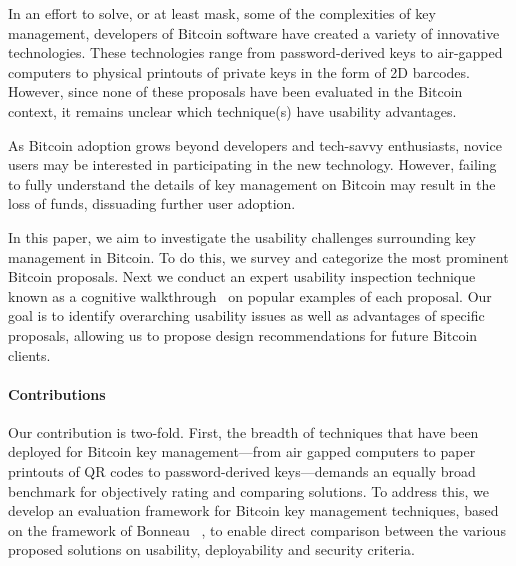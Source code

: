 In an effort to solve, or at least mask, some of the complexities of key management, developers of Bitcoin software have created a variety of innovative technologies. These technologies range  from password-derived keys to air-gapped computers to physical printouts of private keys in the form of 2D barcodes. However, since none of these proposals have been evaluated in the Bitcoin context, it remains unclear which technique(s) have usability advantages.

As Bitcoin adoption grows beyond developers and tech-savvy enthusiasts, novice users may be interested in participating in the new technology. However, failing to fully understand the details of key management on Bitcoin may result in the loss of funds, dissuading further user adoption. 

In this paper, we aim to investigate the usability challenges surrounding key management in Bitcoin. To do this, we survey and categorize the most prominent Bitcoin proposals. Next we conduct an expert usability inspection technique known as a cognitive walkthrough~\cite{WRLP94} on popular examples of each proposal. Our goal is to identify overarching usability issues as well as advantages of specific proposals, allowing us to propose design recommendations for future Bitcoin clients. \\



\paragraph{Contributions}
Our contribution is two-fold. First, the breadth of techniques that have been deployed for Bitcoin key management---from air gapped computers to paper printouts of QR codes to password-derived keys---demands an equally broad benchmark for objectively rating and comparing solutions. To address this, we develop an evaluation framework for Bitcoin key management techniques, based on the framework of Bonneau \etal~\cite{BHOS12}, to enable direct comparison between the various proposed solutions on usability, deployability and security criteria.

